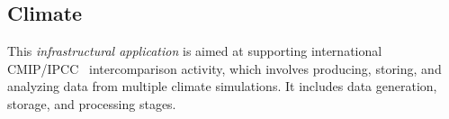 %
%
%
%
%
%
%
%
%
%
%
%
%
%
%
%


\subsection{Climate \label{climateDan}}

%



This {\em infrastructural application} is aimed at supporting
international CMIP/IPCC~\cite{intergovernmental2007fourth,cmip}
intercomparison activity, which involves producing, storing, and
analyzing data from multiple climate simulations.  It includes data
generation, storage, and processing stages.


